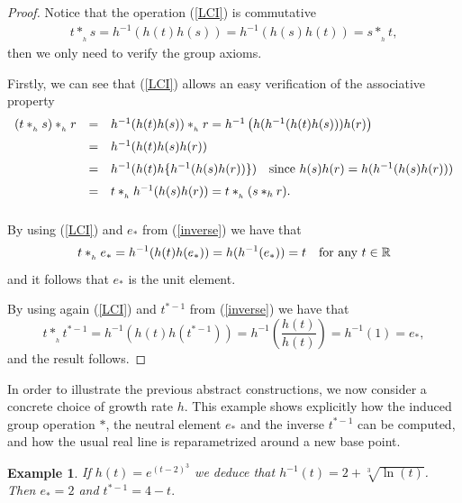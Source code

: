\documentclass[10pt]{amsart}
\newtheorem{example}{Example}
\numberwithin{equation}{section}
\begin{document}
\begin{proof}
Notice that the operation (\ref{LCI}) is commutative
\begin{displaymath}
\begin{array}{rcl}
t \ast_{_h}s =  h^{-1}(h(t)h(s))
= h^{-1}(h(s)h(t))
=  s\ast_{_h}t,
\end{array}
\end{displaymath}
then we only need to verify the group axioms.

Firstly, we can see that (\ref{LCI}) allows an easy verification of the associative property
    \begin{displaymath}
\begin{array}{rcl}
\medskip
(t\ast_{_h}s)\ast_{_h}r & =& h^{-1}(h(t)h(s))\ast_{_h}r
= h^{-1}\left(h(h^{-1}(h(t)h(s)))h(r)\right)\\
\medskip
&=& h^{-1}(h(t)h(s)h(r)) \\
\medskip
&=& h^{-1}(h(t)h\{h^{-1}(h(s)h(r))\}) \quad \textnormal{since $h(s)h(r)=h(h^{-1}(h(s)h(r)))$}\\
\medskip
&=& t\ast_{_h}h^{-1}(h(s)h(r))
= t\ast_{_h}(s\ast_{h} r). 
\end{array}
\end{displaymath}

By using (\ref{LCI}) and $e_{*}$ from (\ref{inverse}) we have that
\begin{displaymath}
t\ast_{_h}e_{*} = h^{-1}(h(t)h(e_{*}))=h(h^{-1}(e_{*}))=t \quad \textnormal{for any $t\in \mathbb{R}$} 
\end{displaymath}
and it follows that $e_{*}$ is the unit element.

By using again (\ref{LCI}) and $t^{*-1}$ from (\ref{inverse}) we have that
\begin{displaymath}
t\ast_{_h}t^{*-1} = h^{-1}(h(t)h(t^{*-1}))= h^{-1}\left(\frac{h(t)}{h(t)}\right)= h^{-1}(1)=e_{*},
\end{displaymath}
and the result follows.
\end{proof}

In order to illustrate the previous abstract constructions, we now consider a concrete choice of
growth rate $h$. This example shows explicitly how the induced group operation $*$, the neutral
element $e_*$ and the inverse $t^{*-1}$ can be computed, and how the usual real line is
reparametrized around a new base point.

\begin{example}\label{ex 1}
    If $h(t)=e^{(t-2)^{3}}$ 
we deduce that $h^{-1}(t)=2+\sqrt[3]{\ln(t)}$. Then  $e_{*}=2$ and $t^{*-1}=4-t.$
\end{example} 
\end{document}
